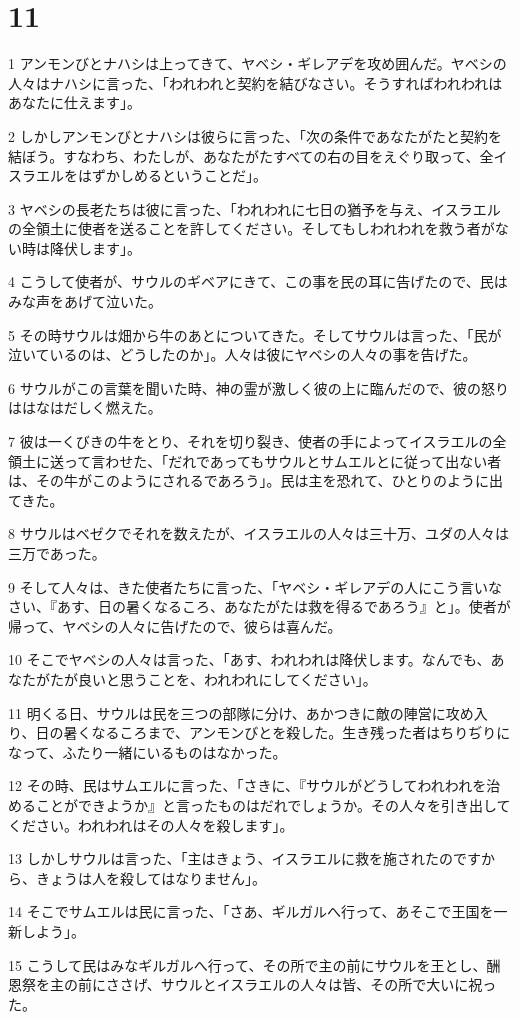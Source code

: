 \chapter{11}

\par 1 アンモンびとナハシは上ってきて、ヤベシ・ギレアデを攻め囲んだ。ヤベシの人々はナハシに言った、「われわれと契約を結びなさい。そうすればわれわれはあなたに仕えます」。
\par 2 しかしアンモンびとナハシは彼らに言った、「次の条件であなたがたと契約を結ぼう。すなわち、わたしが、あなたがたすべての右の目をえぐり取って、全イスラエルをはずかしめるということだ」。
\par 3 ヤベシの長老たちは彼に言った、「われわれに七日の猶予を与え、イスラエルの全領土に使者を送ることを許してください。そしてもしわれわれを救う者がない時は降伏します」。
\par 4 こうして使者が、サウルのギベアにきて、この事を民の耳に告げたので、民はみな声をあげて泣いた。
\par 5 その時サウルは畑から牛のあとについてきた。そしてサウルは言った、「民が泣いているのは、どうしたのか」。人々は彼にヤベシの人々の事を告げた。
\par 6 サウルがこの言葉を聞いた時、神の霊が激しく彼の上に臨んだので、彼の怒りははなはだしく燃えた。
\par 7 彼は一くびきの牛をとり、それを切り裂き、使者の手によってイスラエルの全領土に送って言わせた、「だれであってもサウルとサムエルとに従って出ない者は、その牛がこのようにされるであろう」。民は主を恐れて、ひとりのように出てきた。
\par 8 サウルはベゼクでそれを数えたが、イスラエルの人々は三十万、ユダの人々は三万であった。
\par 9 そして人々は、きた使者たちに言った、「ヤベシ・ギレアデの人にこう言いなさい、『あす、日の暑くなるころ、あなたがたは救を得るであろう』と」。使者が帰って、ヤベシの人々に告げたので、彼らは喜んだ。
\par 10 そこでヤベシの人々は言った、「あす、われわれは降伏します。なんでも、あなたがたが良いと思うことを、われわれにしてください」。
\par 11 明くる日、サウルは民を三つの部隊に分け、あかつきに敵の陣営に攻め入り、日の暑くなるころまで、アンモンびとを殺した。生き残った者はちりぢりになって、ふたり一緒にいるものはなかった。
\par 12 その時、民はサムエルに言った、「さきに、『サウルがどうしてわれわれを治めることができようか』と言ったものはだれでしょうか。その人々を引き出してください。われわれはその人々を殺します」。
\par 13 しかしサウルは言った、「主はきょう、イスラエルに救を施されたのですから、きょうは人を殺してはなりません」。
\par 14 そこでサムエルは民に言った、「さあ、ギルガルへ行って、あそこで王国を一新しよう」。
\par 15 こうして民はみなギルガルへ行って、その所で主の前にサウルを王とし、酬恩祭を主の前にささげ、サウルとイスラエルの人々は皆、その所で大いに祝った。

